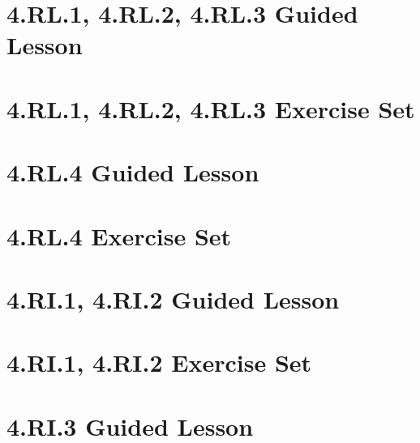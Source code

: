 \documentclass[a4paper,12pt]{article}
\title{}
\date{}
\begin{document}

\newpage

\hypertarget{toc}{}  %
\tableofcontents
\newpage

\pagestyle{main}

\newpage
\section{4.RL.1, 4.RL.2, 4.RL.3 Guided Lesson}


\newpage
\section{4.RL.1, 4.RL.2, 4.RL.3 Exercise Set}


\newpage
\section{4.RL.4 Guided Lesson}


\newpage
\section{4.RL.4 Exercise Set}


\newpage
\section{4.RI.1, 4.RI.2 Guided Lesson}


\newpage
\section{4.RI.1, 4.RI.2 Exercise Set}


\newpage
\section{4.RI.3 Guided Lesson}

\end{document}
